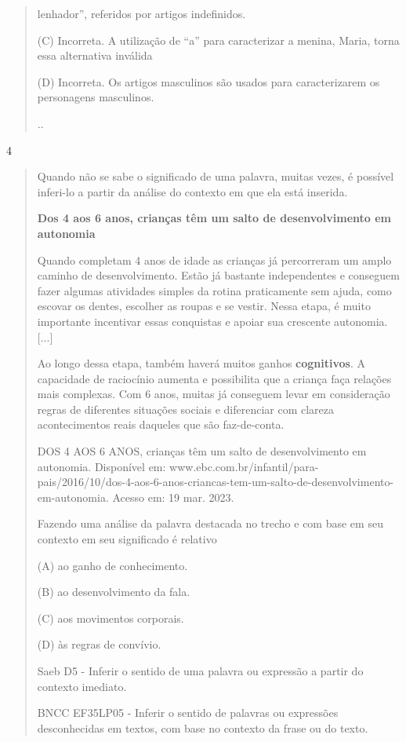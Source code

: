\begin{escolha}
\begin{quote}
lenhador'', referidos por artigos indefinidos.

(C) Incorreta. A utilização de ``a'' para caracterizar a menina, Maria,
torna essa alternativa inválida

(D) Incorreta. Os artigos masculinos são usados para caracterizarem os
personagens masculinos.

..
\end{quote}

\num{4}

\begin{quote}
Quando não se sabe o significado de uma palavra, muitas vezes, é
possível inferi-lo a partir da análise do contexto em que ela está
inserida.

\textbf{Dos 4 aos 6 anos, crianças têm um salto de desenvolvimento em
autonomia}

Quando completam 4 anos de idade as crianças já percorreram um amplo
caminho de desenvolvimento. Estão já bastante independentes e conseguem
fazer algumas atividades simples da rotina praticamente sem ajuda, como
escovar os dentes, escolher as roupas e se vestir. Nessa etapa, é muito
importante incentivar essas conquistas e apoiar sua crescente autonomia.
{[}...{]}

Ao longo dessa etapa, também haverá muitos ganhos \textbf{cognitivos}. A
capacidade de raciocínio aumenta e possibilita que a criança faça
relações mais complexas. Com 6 anos, muitas já conseguem levar em
consideração regras de diferentes situações sociais e diferenciar com
clareza acontecimentos reais daqueles que são faz-de-conta.

DOS 4 AOS 6 ANOS, crianças têm um salto de desenvolvimento em autonomia.
Disponível em:
www.ebc.com.br/infantil/para-pais/2016/10/dos-4-aos-6-anos-criancas-tem-um-salto-de-desenvolvimento-em-autonomia.
Acesso em: 19 mar. 2023.

Fazendo uma análise da palavra destacada no trecho e com base em seu
contexto em seu significado é relativo

(A) ao ganho de conhecimento.

(B) ao desenvolvimento da fala.

(C) aos movimentos corporais.

(D) às regras de convívio.

Saeb D5 - Inferir o sentido de uma palavra ou expressão a partir do
contexto imediato.

BNCC EF35LP05 - Inferir o sentido de palavras ou expressões
desconhecidas em textos, com base no contexto da frase ou do texto.


\end{quote}
\end{escolha}
